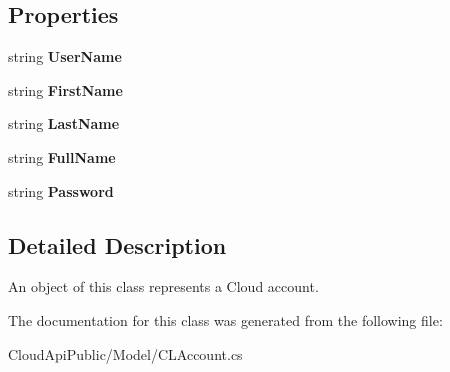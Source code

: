 \subsection*{Properties}
\begin{DoxyCompactItemize}
\item 
\hypertarget{class_cloud_api_public_1_1_model_1_1_c_l_account_a8c919a4a4a2f6db08a36b90589b5f4dc}{string {\bfseries User\-Name}}\label{class_cloud_api_public_1_1_model_1_1_c_l_account_a8c919a4a4a2f6db08a36b90589b5f4dc}

\item 
\hypertarget{class_cloud_api_public_1_1_model_1_1_c_l_account_ab07f7dde522cf2c556cd76f2af53f3dd}{string {\bfseries First\-Name}}\label{class_cloud_api_public_1_1_model_1_1_c_l_account_ab07f7dde522cf2c556cd76f2af53f3dd}

\item 
\hypertarget{class_cloud_api_public_1_1_model_1_1_c_l_account_a695b2a4c590fb8a0dba5235f7800799f}{string {\bfseries Last\-Name}}\label{class_cloud_api_public_1_1_model_1_1_c_l_account_a695b2a4c590fb8a0dba5235f7800799f}

\item 
\hypertarget{class_cloud_api_public_1_1_model_1_1_c_l_account_a65638e59ab14abdc449f456ec76570f3}{string {\bfseries Full\-Name}}\label{class_cloud_api_public_1_1_model_1_1_c_l_account_a65638e59ab14abdc449f456ec76570f3}

\item 
\hypertarget{class_cloud_api_public_1_1_model_1_1_c_l_account_ab5a9edfe8832dac7fa32daeda97cfa7b}{string {\bfseries Password}}\label{class_cloud_api_public_1_1_model_1_1_c_l_account_ab5a9edfe8832dac7fa32daeda97cfa7b}

\end{DoxyCompactItemize}


\subsection{Detailed Description}
An object of this class represents a Cloud account. 



The documentation for this class was generated from the following file\-:\begin{DoxyCompactItemize}
\item 
Cloud\-Api\-Public/\-Model/C\-L\-Account.\-cs\end{DoxyCompactItemize}
